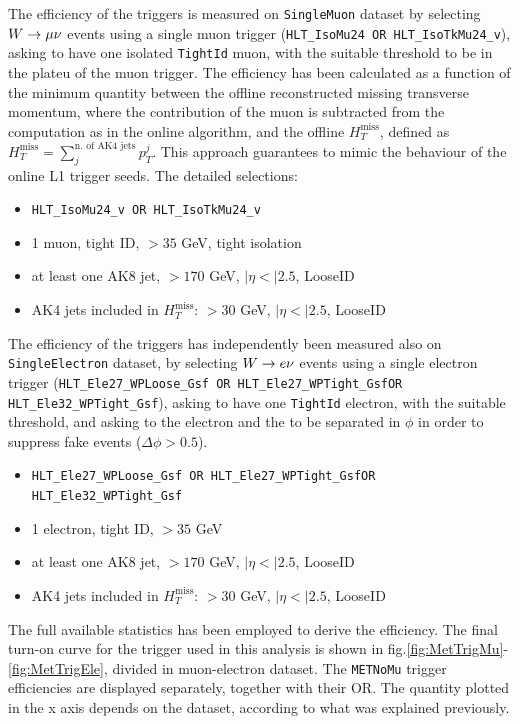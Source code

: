 The efficiency of the \met triggers is measured on {\tt SingleMuon} dataset by selecting $W \to \mu \nu$ events using a single muon trigger ({\tt HLT\_IsoMu24 OR HLT\_IsoTkMu24\_v}), asking to have one isolated {\tt TightId} muon, with the suitable \pt threshold to be in the plateu of the muon trigger. The efficiency has been calculated as a function of the minimum quantity between the offline reconstructed missing transverse momentum, where the contribution of the muon is subtracted from the \met computation as in the online algorithm, and the offline ${H}_T^{\text{miss}}$, defined as ${H}_T^{\text{miss}} = \sum_{j}^{\text{n. of AK4 jets}} p_T^{j}$. This approach guarantees to mimic the behaviour of the online L1 trigger seeds. The detailed selections:
\begin{itemize}
\item {\tt HLT\_IsoMu24\_v OR HLT\_IsoTkMu24\_v}
\item 1 muon, tight ID, \pt$>35$ GeV, tight isolation
\item at least one AK8 jet, \pt$>170$ GeV, $|\eta<|2.5$, LooseID
\item AK4 jets included in ${H}_T^{\text{miss}}$: \pt$>30$ GeV, $|\eta<|2.5$, LooseID
\end{itemize}

The efficiency of the \met triggers has independently been measured also on {\tt SingleElectron} dataset, by selecting $W \rightarrow e \nu$ events using a single electron trigger ({\tt HLT\_Ele27\_WPLoose\_Gsf OR HLT\_Ele27\_WPTight\_GsfOR HLT\_Ele32\_WPTight\_Gsf}), asking to have one {\tt TightId} electron, with the suitable \pt threshold, and asking to the electron and the \met to be separated in $\phi$ in order to suppress fake events ($\Delta \phi > 0.5$).
\begin{itemize}
\item {\tt HLT\_Ele27\_WPLoose\_Gsf OR HLT\_Ele27\_WPTight\_GsfOR HLT\_Ele32\_WPTight\_Gsf}
\item 1 electron, tight ID, \pt$>35$ GeV
\item at least one AK8 jet, \pt$>170$ GeV, $|\eta<|2.5$, LooseID
\item AK4 jets included in ${H}_T^{\text{miss}}$: \pt$>30$ GeV, $|\eta<|2.5$, LooseID
\end{itemize}


The full available statistics has been employed to derive the efficiency. The final turn-on curve for the \met trigger used in this analysis is shown in fig.\ref{fig:MetTrigMu}-\ref{fig:MetTrigEle}, divided in muon-electron dataset. The {\tt METNoMu} trigger efficiencies are displayed separately, together with their OR. The quantity plotted in the x axis depends on the dataset, according to what was explained previously.

